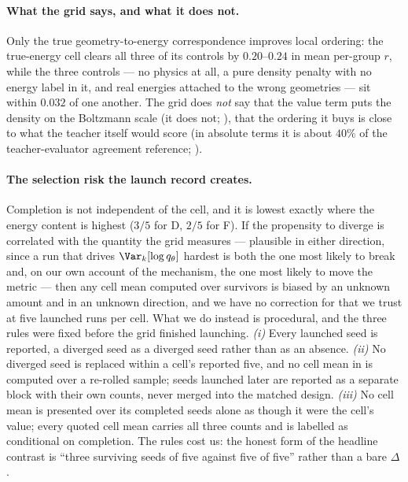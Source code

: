 \paragraph{What the grid says, and what it does not.} Only the true
geometry-to-energy correspondence improves local ordering: the true-energy cell clears
all three of its controls by $0.20$--$0.24$ in mean per-group $r$, while the three
controls --- no physics at all, a pure density penalty with no energy label in it, and
real energies attached to the wrong geometries --- sit within $0.032$ of one another.
The grid does \emph{not} say that the value term puts the density on the Boltzmann
scale (it does not; ), that the ordering it buys is close to what the
teacher itself would score (in absolute terms it is about $40\%$ of the
teacher-evaluator agreement reference; ).

\paragraph{The selection risk the launch record creates.} Completion is not independent
of the cell, and it is lowest exactly where the energy content is highest ($3/5$ for D,
$2/5$ for F). If the propensity to diverge is correlated with the quantity the grid
measures --- plausible in either direction, since a run that drives
$\Var_k[\log q_\theta]$ hardest is both the one most likely to break and, on our own
account of the mechanism, the one most likely to move the metric --- then any cell mean
computed over survivors is biased by an unknown amount and in an unknown direction, and
we have no correction for that we trust at five launched runs per cell. What we do
instead is procedural, and the three rules were fixed before the grid finished
launching. \emph{(i)} Every launched seed is reported, a diverged seed as a diverged
seed rather than as an absence. \emph{(ii)} No diverged seed is replaced within a
cell's reported five, and no cell mean in  is computed over a
re-rolled sample; seeds launched later are reported as a separate block with their own
counts, never merged into the matched design. \emph{(iii)} No cell mean is presented
over its completed seeds alone as though it were the cell's value; every quoted cell
mean carries all three counts and is labelled as conditional on completion. The rules
cost us: the honest form of the headline contrast is ``three surviving seeds of five
against five of five'' rather than a bare $\Delta$.


